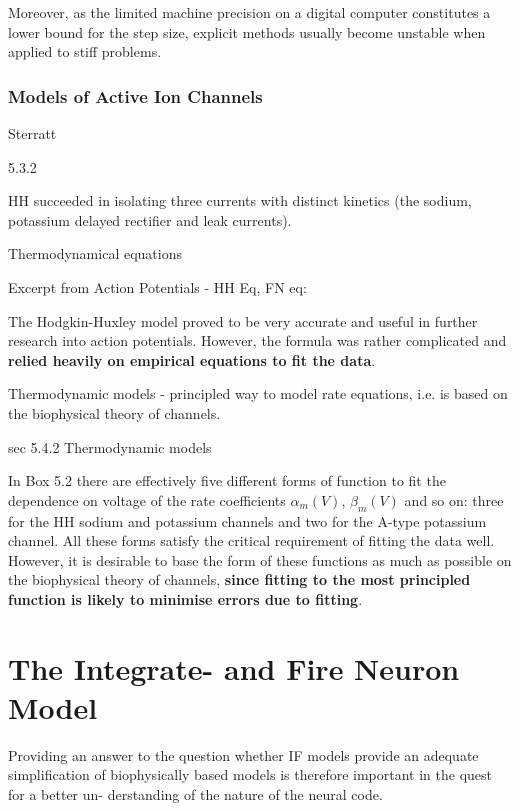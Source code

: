 Moreover, as the limited
machine precision on a digital computer constitutes a lower
bound for the step size, explicit methods usually become unstable
when applied to stiff problems.


\subsubsection{Models of Active Ion Channels}

Sterratt 

5.3.2 

HH succeeded in isolating three currents with distinct kinetics (the sodium, potassium delayed rectifier and leak currents).


Thermodynamical equations 

Excerpt from Action Potentials - HH Eq, FN eq:

The Hodgkin-Huxley model proved to be very accurate and useful in further research into action potentials. However, the formula was rather complicated and \textbf{relied heavily on empirical equations to fit the data}. 

Thermodynamic models - principled way to model rate equations, i.e. is based on the biophysical theory of channels. 

sec 5.4.2 Thermodynamic models

In Box 5.2 there are effectively five different forms of function to fit the dependence on voltage of the rate coefficients $\alpha_m (V)$, $\beta_m (V)$ and so on: three for the HH sodium and potassium channels and two for the A-type potassium channel. All these forms satisfy the critical requirement of fitting the data well. However, it is desirable to base the form of these functions as much as possible on the biophysical theory of channels, \textbf{since fitting to the most principled function is likely to minimise errors due to fitting}.

\section{The Integrate- and Fire Neuron Model}

Providing an answer to the question whether IF models provide an adequate simplification of biophysically based models is therefore important in the quest for a better un- derstanding of the nature of the neural code.


